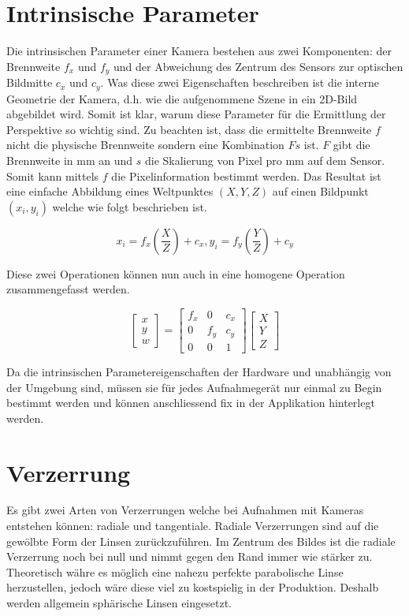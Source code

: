 \section{Intrinsische Parameter}
Die intrinsischen Parameter einer Kamera bestehen aus zwei Komponenten: der Brennweite $f_x$ und $f_y$ und der Abweichung des Zentrum des Sensors zur optischen Bildmitte $c_x$ und $c_y$. Was diese zwei Eigenschaften beschreiben ist die interne Geometrie der Kamera, d.h. wie die aufgenommene Szene in ein 2D-Bild abgebildet wird. Somit ist klar, warum diese Parameter für die Ermittlung der Perspektive so wichtig sind. Zu beachten ist, dass die ermittelte Brennweite $f$ nicht die physische Brennweite sondern eine Kombination $Fs$ ist. $F$ gibt die Brennweite in mm an und $s$ die Skalierung von Pixel pro mm auf dem Sensor. Somit kann mittels $f$ die Pixelinformation bestimmt werden. Das Resultat ist eine einfache Abbildung eines Weltpunktes $(X, Y, Z)$ auf einen Bildpunkt $(x_i, y_i)$ welche wie folgt beschrieben ist.

\begin{equation}
x_i = f_x (\frac{X}{Z}) + c_x,   y_i = f_y (\frac{Y}{Z}) + c_y
\end{equation}

Diese zwei Operationen können nun auch in eine homogene Operation zusammengefasst werden.

\begin{equation}
\begin{bmatrix}
x \\ y \\ w
\end{bmatrix} 
=
\begin{bmatrix}
f_x & 0 & c_x \\
0 & f_y & c_y \\
0 & 0 & 1
\end{bmatrix} 
\begin{bmatrix}
X \\ Y \\ Z
\end{bmatrix} 
\end{equation}

Da die intrinsischen Parametereigenschaften der Hardware und unabhängig von der Umgebung sind, müssen sie für jedes Aufnahmegerät nur einmal zu Begin bestimmt werden und können anschliessend fix in der Applikation hinterlegt werden.

\section{Verzerrung}
Es gibt zwei Arten von Verzerrungen welche bei Aufnahmen mit Kameras entstehen können: radiale und tangentiale. Radiale Verzerrungen sind auf die gewölbte Form der Linsen zurückzuführen. Im Zentrum des Bildes ist die radiale Verzerrung noch bei null und nimmt gegen den Rand immer wie stärker zu. Theoretisch währe es möglich eine nahezu perfekte parabolische Linse herzustellen, jedoch wäre diese viel zu kostspielig in der Produktion. Deshalb werden allgemein sphärische Linsen eingesetzt.

